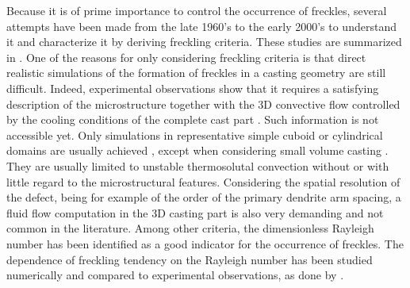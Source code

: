 Because it is of prime importance to control the occurrence of freckles, several attempts have been made 
from the late 1960’s \citep{flemings_macrosegregation:_1967, flemings_macrosegregation:_1968-1,flemings_macrosegregation:_1968} 
to the early 2000’s \citep{ramirez_evaluation_2003} to understand it and characterize it by deriving freckling criteria. 
These studies are summarized in \citep{auburtin_determination_1998}. One of the reasons for only considering freckling criteria 
is that direct realistic simulations of the formation of freckles in a casting geometry are still difficult. 
Indeed, experimental observations show that it requires a satisfying description of the microstructure together 
with the 3D convective flow controlled by the cooling conditions of the complete cast part \citep{shevchenko_chimney_2013}. 
Such information is not accessible yet. Only simulations in representative simple cuboid or cylindrical domains are 
usually achieved \citep{felicelli_simulation_1991,felicelli_modeling_1998,kohler_peritectic_2008,guo_three-dimensional_2003}, 
except when considering small volume casting \citep{desbiolles_micro-macrosegregation_2003}. 
They are usually limited to unstable thermosolutal convection without or with 
little regard to the microstructural features. Considering the spatial resolution of the defect, being for example of the 
order of the primary dendrite arm spacing, a fluid flow computation in the 3D casting part is also very demanding and not 
common in the literature. Among  other criteria, the dimensionless Rayleigh number has been identified as a good indicator 
for  the occurrence of freckles. The dependence of freckling tendency on the Rayleigh number has been studied numerically 
and compared to experimental observations, as done by \citep{ramirez_evaluation_2003}.
